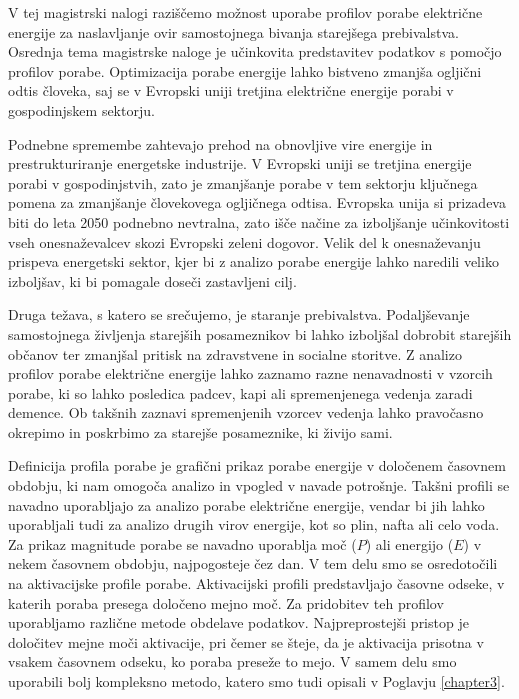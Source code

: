 \begin{sloabstract}
V tej magistrski nalogi raziščemo možnost uporabe profilov porabe električne energije za naslavljanje ovir samostojnega bivanja starejšega prebivalstva. Osrednja tema magistrske naloge je učinkovita predstavitev podatkov s pomočjo profilov porabe. Optimizacija porabe energije lahko bistveno zmanjša ogljični odtis človeka, saj se v Evropski uniji tretjina električne energije porabi v gospodinjskem sektorju. 

Podnebne spremembe zahtevajo prehod na obnovljive vire energije in prestrukturiranje energetske industrije. V Evropski uniji se tretjina energije porabi v gospodinjstvih, zato je zmanjšanje porabe v tem sektorju ključnega pomena za zmanjšanje človekovega ogljičnega odtisa. Evropska unija si prizadeva biti do leta 2050 podnebno nevtralna, zato išče načine za izboljšanje učinkovitosti vseh onesnaževalcev skozi Evropski zeleni dogovor. Velik del k onesnaževanju prispeva energetski sektor, kjer bi z analizo porabe energije lahko naredili veliko izboljšav, ki bi pomagale doseči zastavljeni cilj. 

Druga težava, s katero se srečujemo, je staranje prebivalstva. Podaljševanje samostojnega življenja starejših posameznikov bi lahko izboljšal dobrobit starejših občanov ter zmanjšal pritisk na zdravstvene in socialne storitve. Z analizo profilov porabe električne energije lahko zaznamo razne nenavadnosti v vzorcih porabe, ki so lahko posledica padcev, kapi ali spremenjenega vedenja zaradi demence. Ob takšnih zaznavi spremenjenih vzorcev vedenja lahko pravočasno okrepimo in poskrbimo za starejše posameznike, ki živijo sami.  

Definicija profila porabe je grafični prikaz porabe energije v določenem časovnem obdobju, ki nam omogoča analizo in vpogled v navade potrošnje. Takšni profili se navadno uporabljajo za analizo porabe električne energije, vendar bi jih lahko uporabljali tudi za analizo drugih virov energije, kot so plin, nafta ali celo voda. Za prikaz magnitude porabe se navadno uporablja moč ($P$) ali energijo ($E$) v nekem časovnem obdobju, najpogosteje čez dan. V tem delu smo se osredotočili na aktivacijske profile porabe. Aktivacijski profili predstavljajo časovne odseke, v katerih poraba presega določeno mejno moč. Za pridobitev teh profilov uporabljamo različne metode obdelave podatkov. Najpreprostejši pristop je določitev mejne moči aktivacije, pri čemer se šteje, da je aktivacija prisotna v vsakem časovnem odseku, ko poraba preseže to mejo. V samem delu smo uporabili bolj kompleksno metodo, katero smo tudi opisali v Poglavju \ref{chapter3}. 


\end{sloabstract}
